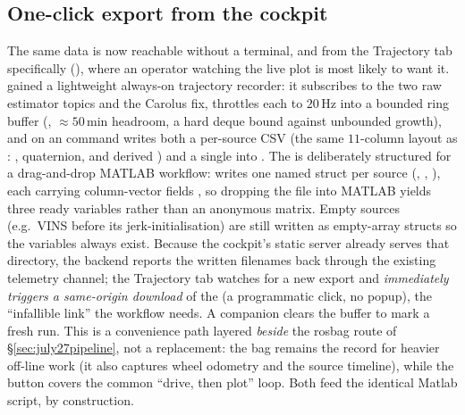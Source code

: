 \subsection{One-click export from the cockpit}
\label{sec:july27export}
The same data is now reachable without a terminal, and from the Trajectory
tab specifically (), where an operator watching the
live plot is most likely to want it.  gained a
lightweight always-on trajectory recorder: it subscribes to the two raw
estimator topics and the Carolus fix, throttles each to $20$\,Hz into a
bounded ring buffer (, $\approx 50$\,min headroom, a hard
deque bound against unbounded growth), and on an 
command writes both a per-source CSV (the same $11$-column layout as
: , quaternion, and derived
) and a single  into . The
 is deliberately structured for a drag-and-drop MATLAB workflow:
 writes one named struct per source
(, , ), each carrying column-vector
fields , so dropping the file into MATLAB
yields three ready variables rather than an anonymous matrix. Empty sources
(e.g.\ VINS before its jerk-initialisation) are still written as empty-array
structs so the variables always exist. Because the cockpit's static server
already serves that directory, the backend reports the written filenames back
through the existing telemetry channel; the Trajectory tab watches for a new
export and \emph{immediately triggers a same-origin download} of the
 (a programmatic  click, no popup), the
``infallible link'' the workflow needs. A companion  clears the
buffer to mark a fresh run. This is a convenience path layered \emph{beside}
the rosbag route of \S\ref{sec:july27pipeline}, not a replacement: the bag
remains the record for heavier off-line work (it also captures wheel odometry
and the source timeline), while the button covers the common ``drive, then
plot'' loop. Both feed the identical Matlab script, by construction.

